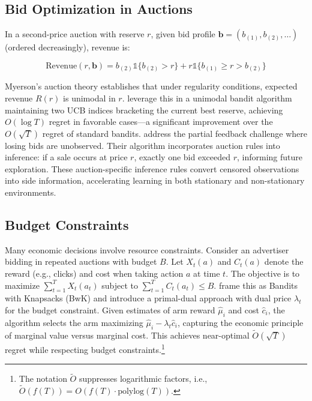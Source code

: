 \subsection{Bid Optimization in Auctions}

In a second-price auction with reserve $r$, given bid profile $\mathbf{b} = (b_{(1)}, b_{(2)}, \ldots)$ (ordered decreasingly), revenue is:

\begin{equation}
\text{Revenue}(r,\mathbf{b}) = b_{(2)}\mathbb{1}\{b_{(2)} > r\} + r\mathbb{1}\{b_{(1)} \geq r > b_{(2)}\}
\end{equation}

Myerson's auction theory establishes that under regularity conditions, expected revenue $R(r)$ is unimodal in $r$. \citet{CesaBianchi2015} leverage this in a unimodal bandit algorithm maintaining two UCB indices bracketing the current best reserve, achieving $O(\log T)$ regret in favorable cases—a significant improvement over the $O(\sqrt{T})$ regret of standard bandits. \citet{Akcay2022} address the partial feedback challenge where losing bids are unobserved. Their algorithm incorporates auction rules into inference: if a sale occurs at price $r$, exactly one bid exceeded $r$, informing future exploration. These auction-specific inference rules convert censored observations into side information, accelerating learning in both stationary and non-stationary environments.

\subsection{Budget Constraints}

Many economic decisions involve resource constraints. Consider an advertiser bidding in repeated auctions with budget $B$. Let $X_t(a)$ and $C_t(a)$ denote the reward (e.g., clicks) and cost when taking action $a$ at time $t$. The objective is to maximize $\sum_{t=1}^T X_t(a_t)$ subject to $\sum_{t=1}^T C_t(a_t) \leq B$. \citet{Badanidiyuru2013} frame this as Bandits with Knapsacks (BwK) and introduce a primal-dual approach with dual price $\lambda_t$ for the budget constraint. Given estimates of arm reward $\hat{\mu}_i$ and cost $\hat{c}_i$, the algorithm selects the arm maximizing $\hat{\mu}_i - \lambda_t\hat{c}_i$, capturing the economic principle of marginal value versus marginal cost. This achieves near-optimal $\tilde{O}(\sqrt{T})$ regret while respecting budget constraints.\footnote{The notation $\tilde{O}$ suppresses logarithmic factors, i.e., $\tilde{O}(f(T)) = O(f(T) \cdot \text{polylog}(T))$.}

